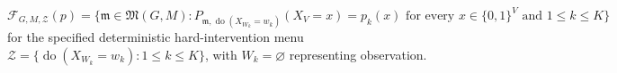 \(\mathcal F_{G,M,\mathcal Z}(p)=\{\mathfrak m\in\mathfrak M(G,M):P_{\mathfrak m,\operatorname{do}(X_{W_k}=w_k)}(X_V=x)=p_k(x)\text{ for every }x\in\{0,1\}^{V}\text{ and }1\le k\le K\}\) for the specified deterministic hard-intervention menu \(\mathcal Z=\{\operatorname{do}(X_{W_k}=w_k):1\le k\le K\}\), with \(W_k=\varnothing\) representing observation.